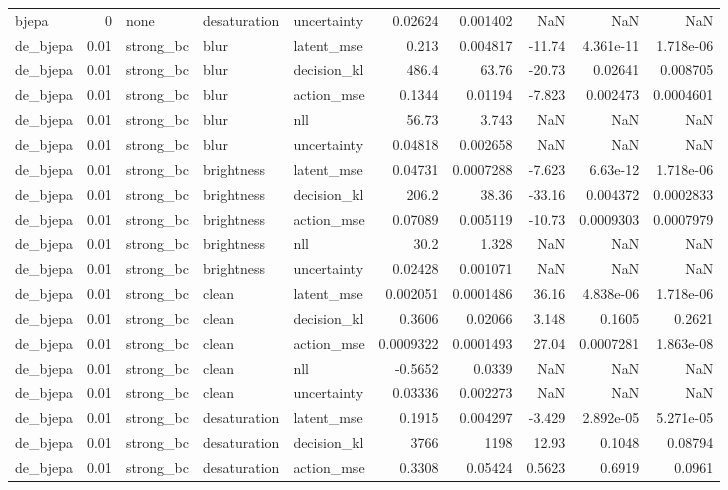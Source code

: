 \begin{tabular}{lrlllrrrrr}
bjepa & 0 & none & desaturation & uncertainty & 0.02624 & 0.001402 & NaN & NaN & NaN \\
de\_bjepa & 0.01 & strong\_bc & blur & latent\_mse & 0.213 & 0.004817 & -11.74 & 4.361e-11 & 1.718e-06 \\
de\_bjepa & 0.01 & strong\_bc & blur & decision\_kl & 486.4 & 63.76 & -20.73 & 0.02641 & 0.008705 \\
de\_bjepa & 0.01 & strong\_bc & blur & action\_mse & 0.1344 & 0.01194 & -7.823 & 0.002473 & 0.0004601 \\
de\_bjepa & 0.01 & strong\_bc & blur & nll & 56.73 & 3.743 & NaN & NaN & NaN \\
de\_bjepa & 0.01 & strong\_bc & blur & uncertainty & 0.04818 & 0.002658 & NaN & NaN & NaN \\
de\_bjepa & 0.01 & strong\_bc & brightness & latent\_mse & 0.04731 & 0.0007288 & -7.623 & 6.63e-12 & 1.718e-06 \\
de\_bjepa & 0.01 & strong\_bc & brightness & decision\_kl & 206.2 & 38.36 & -33.16 & 0.004372 & 0.0002833 \\
de\_bjepa & 0.01 & strong\_bc & brightness & action\_mse & 0.07089 & 0.005119 & -10.73 & 0.0009303 & 0.0007979 \\
de\_bjepa & 0.01 & strong\_bc & brightness & nll & 30.2 & 1.328 & NaN & NaN & NaN \\
de\_bjepa & 0.01 & strong\_bc & brightness & uncertainty & 0.02428 & 0.001071 & NaN & NaN & NaN \\
de\_bjepa & 0.01 & strong\_bc & clean & latent\_mse & 0.002051 & 0.0001486 & 36.16 & 4.838e-06 & 1.718e-06 \\
de\_bjepa & 0.01 & strong\_bc & clean & decision\_kl & 0.3606 & 0.02066 & 3.148 & 0.1605 & 0.2621 \\
de\_bjepa & 0.01 & strong\_bc & clean & action\_mse & 0.0009322 & 0.0001493 & 27.04 & 0.0007281 & 1.863e-08 \\
de\_bjepa & 0.01 & strong\_bc & clean & nll & -0.5652 & 0.0339 & NaN & NaN & NaN \\
de\_bjepa & 0.01 & strong\_bc & clean & uncertainty & 0.03336 & 0.002273 & NaN & NaN & NaN \\
de\_bjepa & 0.01 & strong\_bc & desaturation & latent\_mse & 0.1915 & 0.004297 & -3.429 & 2.892e-05 & 5.271e-05 \\
de\_bjepa & 0.01 & strong\_bc & desaturation & decision\_kl & 3766 & 1198 & 12.93 & 0.1048 & 0.08794 \\
de\_bjepa & 0.01 & strong\_bc & desaturation & action\_mse & 0.3308 & 0.05424 & 0.5623 & 0.6919 & 0.0961 \\

\end{tabular}
